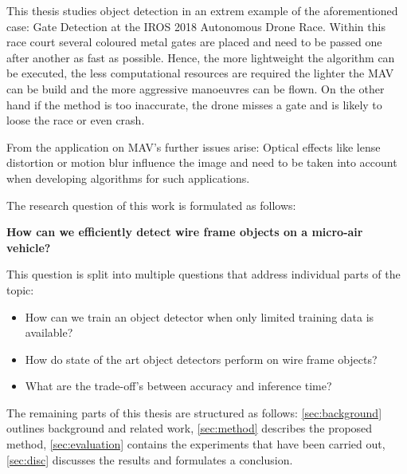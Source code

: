 This thesis studies object detection in an extrem example of the aforementioned case: Gate Detection at the IROS 2018 Autonomous Drone Race. Within this race court several coloured metal gates are placed and need to be passed one after another as fast as possible. Hence, the more lightweight the algorithm can be executed, the less computational resources are required the lighter the \ac{MAV} can be build and the more aggressive manoeuvres can be flown. On the other hand if the method is too inaccurate, the drone misses a gate and is likely to loose the race or even crash.

From the application on MAV's further issues arise: Optical effects like lense distortion or motion blur influence the image and need to be taken into account when developing algorithms for such applications.

The research question of this work is formulated as follows:

\textbf{How can we efficiently detect wire frame objects on a micro-air vehicle?}

This question is split into multiple questions that address individual parts of the topic:

\begin{itemize}
	\item How can we train an object detector when only limited training data is available?
	\item How do state of the art object detectors perform on wire frame objects?
	\item What are the trade-off's between accuracy and inference time?
\end{itemize}

The remaining parts of this thesis are structured as follows: \autoref{sec:background} outlines background and related work, \autoref{sec:method} describes the proposed method, \autoref{sec:evaluation} contains the  experiments that have been carried out, \autoref{sec:disc} discusses the results and formulates a conclusion.
